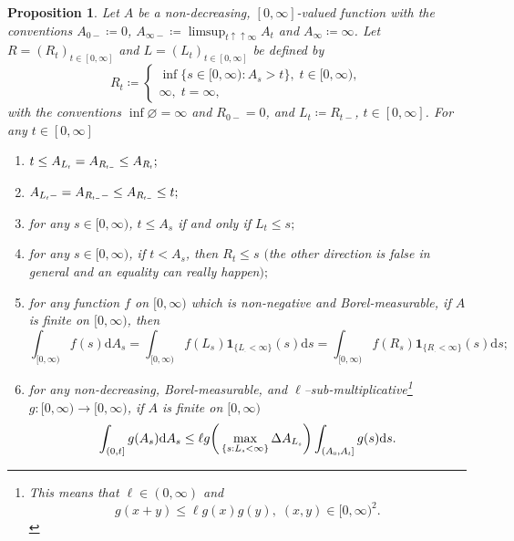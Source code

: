 \documentclass[10pt]{article} %
\newtheorem{proposition}[theorem]{Proposition}
\newcommand{\smalltext}[1]{\text{\fontsize{4}{4}\selectfont$#1$}}
\newcommand{\1}{\mathbf{1}}
\def\d{\mathrm{d}}
\begin{document}
\begin{proposition}\label{lem::leb_stj}
	Let $A$ be a non-decreasing, $[0,\infty]$-valued function with the conventions $A_{0-} \coloneqq 0$, $A_{\infty-} \coloneqq \limsup_{t \uparrow\uparrow \infty} A_t$ and $A_\infty \coloneqq \infty$.  Let $R = (R_t)_{t\in[0,\infty]}$ and $L = (L_t)_{t\in[0,\infty]}$ be defined by
		\begin{equation*}
			R_t \coloneqq 
			\begin{cases}
				\inf\{ s \in [0,\infty) : A_s > t\}, \; t \in [0,\infty), \\
				\infty, \; t = \infty, 
			\end{cases}
		\end{equation*}
		with the conventions $\inf \varnothing = \infty$ and $R_{0-} = 0$, and $L_t \coloneqq R_{t-}$, $t\in[0,\infty]$. For any $t\in [0,\infty]$
		\begin{enumerate}
			\item[$(i)$] $t \leq A_{L_\smalltext{t}} = A_{R_{\smalltext{t}\smalltext{-}}} \leq A_{R_\smalltext{t}};$
			\item[$(ii)$] $A_{L_\smalltext{t}-} = A_{R_{\smalltext{t}\smalltext{-}}-} \leq A_{R_{\smalltext{t}\smalltext{-}}} \leq t;$
			\item[$(iii)$] for any $s\in[0,\infty)$, $t \leq A_s$ if and only if $L_t \leq s;$
			\item[$(iv)$] for any $s\in[0,\infty)$, if $t < A_s$, then $R_t \leq s$ $($the other direction is false in general and an equality can really happen$);$
			\item [$(v)$] for any function $f$ on $[0,\infty)$ which is non-negative and Borel-measurable, if $A$ is finite on $[0,\infty)$, then
			\begin{equation*}
				\int_{[0,\infty)} f(s) \d A_s = \int_{[0,\infty)} f(L_s) \mathbf{1}_{\{L_\cdot < \infty\}}(s) \d s = \int_{[0,\infty)} f(R_s) \mathbf{1}_{\{R_\cdot < \infty\}}(s) \d s;
			\end{equation*}
			\item[$(vi)$] for any non-decreasing, Borel-measurable, and $\ell$--sub-multiplicative\footnote{This means that $\ell \in (0,\infty)$ and
				\begin{equation*}
					g(x+y) \leq \ell g(x)g(y),\; (x,y) \in [0,\infty)^2.
				\end{equation*}} $g : [0,\infty) \longrightarrow [0,\infty)$, if $A$ is finite on $[0,\infty)$
				\begin{equation*}
					\int_{(0,t]} g(A_s) \d A_s \leq \ell g\bigg( \max_{\{s : L_\smalltext{s} < \infty\}} \Delta A_{L_\smalltext{s}} \bigg) \int_{(A_\smalltext{0}, A_\smalltext{t}]} g(s) \d s.
				\end{equation*}
		\end{enumerate}
\end{proposition}
\end{document}
